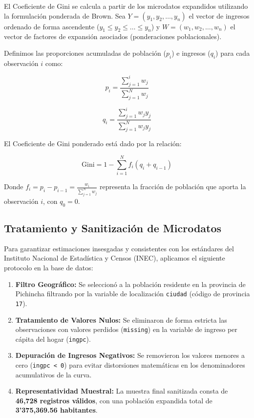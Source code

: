 \documentclass[12pt,spanish]{article}
\providecommand{\tightlist}{%
  \setlength{\itemsep}{0pt}\setlength{\parskip}{0pt}}
\begin{document}
El Coeficiente de Gini se calcula a partir de los microdatos expandidos
utilizando la formulación ponderada de Brown. Sea
\(Y = (y_1, y_2, \dots, y_n)\) el vector de ingresos ordenado de forma
ascendente (\(y_1 \le y_2 \le \dots \le y_n\)) y
\(W = (w_1, w_2, \dots, w_n)\) el vector de factores de expansión
asociados (ponderaciones poblacionales).

Definimos las proporciones acumuladas de población (\(p_i\)) e ingresos
(\(q_i\)) para cada observación \(i\) como:

\[p_i = \frac{\sum_{j=1}^{i} w_j}{\sum_{j=1}^{N} w_j}\]

\[q_i = \frac{\sum_{j=1}^{i} w_j y_j}{\sum_{j=1}^{N} w_j y_j}\]

El Coeficiente de Gini ponderado está dado por la relación:

\[\text{Gini} = 1 - \sum_{i=1}^{N} f_i \left( q_i + q_{i-1} \right)\]

Donde \(f_i = p_i - p_{i-1} = \frac{w_i}{\sum_{j=1}^{N} w_j}\)
representa la fracción de población que aporta la observación \(i\), con
\(q_0 = 0\).

\subsection{Tratamiento y Sanitización de
Microdatos}\label{tratamiento-y-sanitizaciuxf3n-de-microdatos}

Para garantizar estimaciones insesgadas y consistentes con los
estándares del Instituto Nacional de Estadística y Censos (INEC),
aplicamos el siguiente protocolo en la base de datos:

\begin{enumerate}
\def\labelenumi{\arabic{enumi}.}
\tightlist
\item
  \textbf{Filtro Geográfico:} Se seleccionó a la población residente en
  la provincia de Pichincha filtrando por la variable de localización
  \texttt{ciudad} (código de provincia \texttt{17}).
\item
  \textbf{Tratamiento de Valores Nulos:} Se eliminaron de forma estricta
  las observaciones con valores perdidos (\texttt{missing}) en la
  variable de ingreso per cápita del hogar (\texttt{ingpc}).
\item
  \textbf{Depuración de Ingresos Negativos:} Se removieron los valores
  menores a cero (\texttt{ingpc\ \textless{}\ 0}) para evitar
  distorsiones matemáticas en los denominadores acumulativos de la
  curva.
\item
  \textbf{Representatividad Muestral:} La muestra final sanitizada
  consta de \textbf{46,728 registros válidos}, con una población
  expandida total de \textbf{3'375,369.56 habitantes}.
\end{enumerate}
\end{document}
